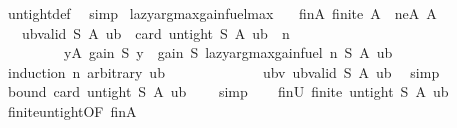\begin{isabellebody}
\ untight{\isacharunderscore}{\kern0pt}def\ \isamarkupfalse%
\ simp%
\endisatagproof
{\isafoldproof}%
%
\isadelimproof
\isanewline
%
\endisadelimproof
\isanewline
{}\isamarkupfalse%
\ lazy{\isacharunderscore}{\kern0pt}argmax{\isacharunderscore}{\kern0pt}gain{\isacharunderscore}{\kern0pt}fuel{\isacharunderscore}{\kern0pt}max{\isacharcolon}{\kern0pt}\isanewline
\ \ \ finA{\isacharcolon}{\kern0pt}\ {\isachardoublequoteopen}finite\ A{\isachardoublequoteclose}\ \ neA{\isacharcolon}{\kern0pt}\ {\isachardoublequoteopen}A\ {\isasymnoteq}\ {\isacharbraceleft}{\kern0pt}{\isacharbraceright}{\kern0pt}{\isachardoublequoteclose}\isanewline
\ \ \ {\isachardoublequoteopen}ub{\isacharunderscore}{\kern0pt}valid\ S\ A\ ub\ {\isasymLongrightarrow}\ card\ {\isacharparenleft}{\kern0pt}untight\ S\ A\ ub{\isacharparenright}{\kern0pt}\ {\isasymle}\ n\ {\isasymLongrightarrow}\isanewline
\ \ \ \ \ \ \ \ \ {\isasymforall}y{\isasymin}A{\isachardot}{\kern0pt}\ gain\ S\ y\ {\isasymle}\ gain\ S\ {\isacharparenleft}{\kern0pt}lazy{\isacharunderscore}{\kern0pt}argmax{\isacharunderscore}{\kern0pt}gain{\isacharunderscore}{\kern0pt}fuel\ n\ S\ A\ ub{\isacharparenright}{\kern0pt}{\isachardoublequoteclose}\isanewline
%
\isadelimproof
%
\endisadelimproof
%
\isatagproof
{}\isamarkupfalse%
\ {\isacharparenleft}{\kern0pt}induction\ n\ arbitrary{\isacharcolon}{\kern0pt}\ ub{\isacharparenright}{\kern0pt}\isanewline
\ \ \isamarkupfalse%
\ {}\isanewline
\ \ \isanewline
\ \ \isamarkupfalse%
\ {}\ \isamarkupfalse%
\ ubv{\isacharcolon}{\kern0pt}\ {\isachardoublequoteopen}ub{\isacharunderscore}{\kern0pt}valid\ S\ A\ ub{\isachardoublequoteclose}\ \isamarkupfalse%
\ simp\isanewline
\ \ \isamarkupfalse%
\ {}\ \isamarkupfalse%
\ bound{\isacharcolon}{\kern0pt}\ {\isachardoublequoteopen}card\ {\isacharparenleft}{\kern0pt}untight\ S\ A\ ub{\isacharparenright}{\kern0pt}\ {\isasymle}\ {}{\isachardoublequoteclose}\ \isamarkupfalse%
\ simp\isanewline
\isanewline
\ \ \isamarkupfalse%
\ finU{\isacharcolon}{\kern0pt}\ {\isachardoublequoteopen}finite\ {\isacharparenleft}{\kern0pt}untight\ S\ A\ ub{\isacharparenright}{\kern0pt}{\isachardoublequoteclose}\ \isamarkupfalse%
\ finite{\isacharunderscore}{\kern0pt}untight{\isacharbrackleft}{\kern0pt}OF\ finA{\isacharbrackright}{\kern0pt}\ \isakeywordONE{{\isachardot}{\kern0pt}}\isamarkupfalse%

\end{isabellebody}
